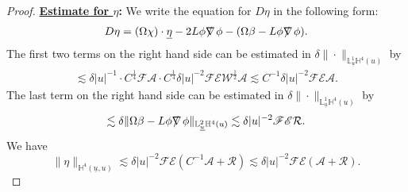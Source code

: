 \documentclass[11pt,reqno]{amsart}
\theoremstyle{definition}
\numberwithin{equation}{section}
\renewcommand{\L}{\mathbb{L}}
\renewcommand{\H}{\mathbb{H}}
\def\etab{\underline{\eta}}
\def\ub{\underline{u}}
\def\nablas{\mbox{$\nabla \mkern -13mu /$ }}
\begin{document}
\begin{proof}
{\bf \underline{Estimate for $\eta$}:} We write the equation for $D\eta$ in the following form:
\begin{align}\label{equ-Deta}
D\eta = (\Omega\chi)\cdot\etab-2L\phi\nablas\phi-(\Omega\beta-L\phi\nablas\phi).\end{align}
The first two terms on the right hand side can be estimated in $\delta\|\cdot\|_{\L^1_{\ub}\H^4(u)}$ by
\begin{align*}
\lesssim \delta|u|^{-1}\cdot C^{\frac{1}{4}}\mathscr{F}\mathcal{A}\cdot C^{\frac{1}{4}}\delta|u|^{-2}\mathscr{F}\mathscr{E}\mathscr{W}^{\frac{1}{2}}\mathcal{A}\lesssim C^{-1}\delta|u|^{-2}\mathscr{F}\mathscr{E}\mathcal{A}.
\end{align*}
The last term on the right hand side can be estimated in $\delta\|\cdot\|_{\L^1_{\ub}\H^4(u)}$ by
\begin{align*}
\lesssim\delta\|\Omega\beta-L\phi\nablas\phi\|_{\L^2_{\ub}\H^4(u)}\lesssim\delta|u|^{-2}\mathscr{F}\mathscr{E}\mathcal{R}.
\end{align*}
We have
\begin{equation}\label{estimate-eta}
\|\eta\|_{\H^4(\ub,u)}\lesssim\delta|u|^{-2}\mathscr{F}\mathscr{E}(C^{-1}\mathcal{A}+\mathcal{R})\lesssim\delta|u|^{-2}\mathscr{F}\mathscr{E}(\mathcal{A}+\mathcal{R}).
\end{equation}



\end{proof}
\end{document}
